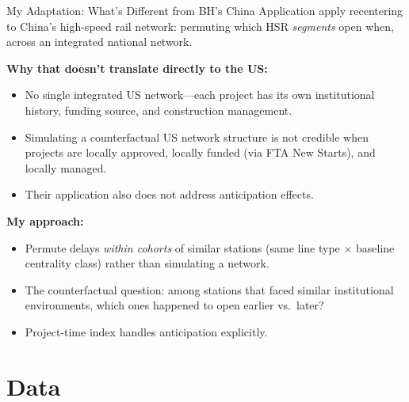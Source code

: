 \documentclass{beamer}
\begin{document}
\begin{frame}{My Adaptation: What's Different from BH's China Application}
\small
\textcite{borusyak_nonrandom_2023} apply recentering to China's high-speed rail network:
permuting which HSR \emph{segments} open when, across an integrated national network.

\medskip
\textbf{Why that doesn't translate directly to the US:}
\begin{itemize}
    \item No single integrated US network---each project has its own institutional history,
          funding source, and construction management.
    \item Simulating a counterfactual US network structure is not credible when projects
          are locally approved, locally funded (via FTA New Starts), and locally managed.
    \item Their application also does not address anticipation effects.
\end{itemize}

\medskip
\textbf{My approach:}
\begin{itemize}
    \item Permute delays \emph{within cohorts} of similar stations (same line type
          $\times$ baseline centrality class) rather than simulating a network.
    \item The counterfactual question: among stations that faced similar
          institutional environments, which ones happened to open earlier vs.\ later?
    \item Project-time index handles anticipation explicitly.
\end{itemize}
\end{frame}

\section{Data}
\end{document}
